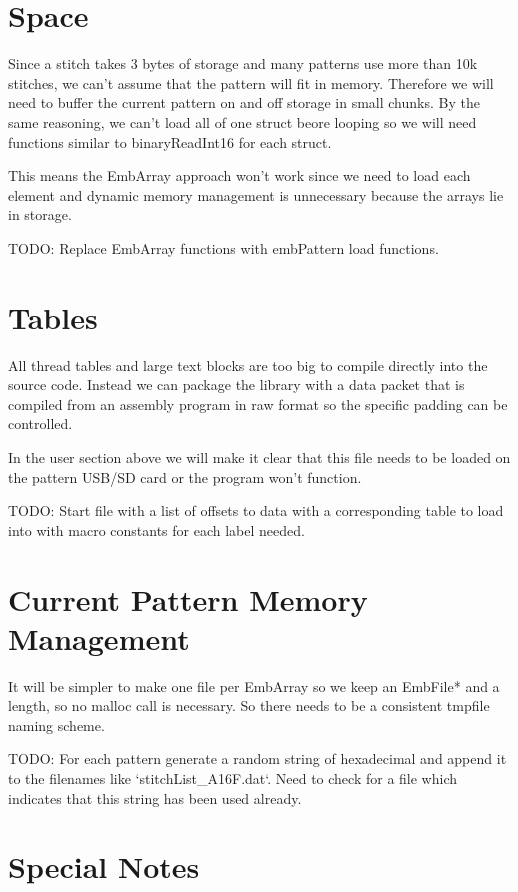 \section{Space}

Since a stitch takes 3 bytes of storage and many patterns use more than
10k stitches, we can't assume that the pattern will fit in memory. Therefore
we will need to buffer the current pattern on and off storage in small
chunks. By the same reasoning, we can't load all of one struct beore
looping so we will need functions similar to binaryReadInt16 for each
struct.

This means the EmbArray approach won't work since we need to load
each element and dynamic memory management is unnecessary because
the arrays lie in storage.

TODO: Replace EmbArray functions with embPattern load functions.

\section{Tables}

All thread tables and large text blocks are too big to compile directly
into the source code. Instead we can package the library with a data packet
that is compiled from an assembly program in raw format so the specific
padding can be controlled.

In the user section above we will make it clear that this file
needs to be loaded on the pattern USB/SD card or the program won't function.

TODO: Start file with a list of offsets to data with a corresponding table
to load into with macro constants for each label needed.

\section{Current Pattern Memory Management}

It will be simpler to make one file per EmbArray so we keep an EmbFile*
and a length, so no malloc call is necessary. So there needs to be a consistent
tmpfile naming scheme.

TODO: For each pattern generate a random string of hexadecimal and append it
to the filenames like `stitchList\_A16F.dat`. Need to check for a file
which indicates that this string has been used already.

\section{Special Notes}

